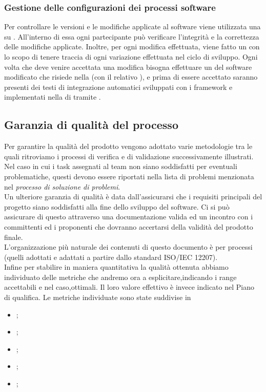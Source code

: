 \subsubsection{Gestione delle configurazioni dei processi software}
Per controllare le versioni e le modifiche applicate al software viene utilizzata una  su . All'interno di essa ogni partecipante può verificare l'integrità e la correttezza delle modifiche applicate. Inoltre, per ogni modifica effettuata, viene fatto un  con lo scopo di tenere traccia di ogni variazione effettuata nel ciclo di sviluppo. Ogni volta che deve venire accettata una modifica bisogna effettuare un 	 del software modificato che risiede nella  (con il relativo ), e prima di essere accettato saranno presenti dei testi di integrazione automatici sviluppati con i framework  e  implementati nella  di  tramite .

\subsection{Garanzia di qualità del processo}
Per garantire la qualità del prodotto vengono adottato varie metodologie tra le quali ritroviamo i processi di verifica e di validazione successivamente illustrati. \\
Nel caso in cui i task assegnati al team non siano soddisfatti per eventuali problematiche, questi devono essere riportati nella lista di problemi menzionata nel \textit{processo di soluzione di problemi}. \\
Un ulteriore garanzia di qualità è data dall'assicurarsi che i requisiti principali del progetto siano soddisfatti alla fine dello sviluppo del software. Ci si può assicurare di questo attraverso una documentazione valida ed un incontro con i committenti ed i proponenti che dovranno accertarsi della validità del prodotto finale. \\
L'organizzazione più naturale dei contenuti di questo documento è per processi (quelli adottati e adattati a partire dallo standard ISO/IEC 12207).\\
Infine per stabilire in maniera quantitativa la qualità ottenuta abbiamo individuato delle metriche che andremo ora a esplicitare,indicando i range accettabili e nel caso,ottimali. Il loro valore effettivo è invece indicato nel Piano di qualifica.
Le metriche individuate sono state suddivise in
\begin{itemize}
	\item\textbf{};
	\item\textbf{};
	\item\textbf{};
	\item\textbf{};
	\item\textbf{};
\end{itemize}

